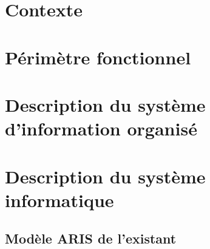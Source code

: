 

\newcommand{\mainTitle}{\'Etude préalable - SPIE}
\newcommand{\secondTitle}{\'Etude de l'\'Existant}
\newcommand{\documentRef}{DEB-EE/4401/1}
\newcommand{\auteurs}{
Lisa \textsc{Courant} \\
Estelle \textsc{Lepeigneux} \\
Pierre \textsc{Jarsaillon} \\
Hugues \textsc{Verlin} \\
}
\newcommand{\chefDeProjet}{Paul \textsc{Dautry}}
\newcommand{\responsableQualite}{Antoine \textsc{Chabert}}





\tableofcontents
\listoffigures
\listoftables
\newpage

\part{Contexte}
\setcounter{section}{0}

\part{Périmètre fonctionnel}
\setcounter{section}{0}

\part{Description du système d'information organisé}
\setcounter{section}{0}

\part{Description du système informatique}
\setcounter{section}{0}



\appendix
\chapter{Modèle ARIS de l'existant}

